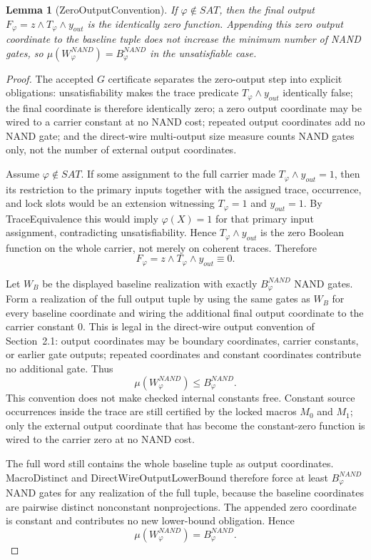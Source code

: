 \documentclass[10.5pt,a4paper]{article}
\newtheorem{lemma}[theorem]{Lemma}
\begin{document}
\begin{lemma}[ZeroOutputConvention]
If \(\varphi\notin SAT\), then the final output \(F_\varphi=z\wedge T_\varphi\wedge y_{out}\) is the identically
zero function.  Appending this zero output coordinate to the baseline tuple does not increase the minimum
number of NAND gates, so \(\mu(W^{NAND}_\varphi)=B^{NAND}_\varphi\) in the unsatisfiable case.
\end{lemma}
\begin{proof}
The accepted \(G\) certificate separates the zero-output step into explicit obligations: unsatisfiability makes the
trace predicate \(T_\varphi\wedge y_{out}\) identically false; the final coordinate is therefore identically zero;
a zero output coordinate may be wired to a carrier constant at no NAND cost; repeated output coordinates add
no NAND gate; and the direct-wire multi-output size measure counts NAND gates only, not the number of
external output coordinates.

Assume \(\varphi\notin SAT\).  If some assignment to the full carrier made
\(T_\varphi\wedge y_{out}=1\), then its restriction to the primary inputs together with the assigned trace,
occurrence, and lock slots would be an extension witnessing \(T_\varphi=1\) and \(y_{out}=1\).  By
TraceEquivalence this would imply \(\varphi(X)=1\) for that primary input assignment, contradicting
unsatisfiability.  Hence \(T_\varphi\wedge y_{out}\) is the zero Boolean function on the whole carrier, not merely
on coherent traces.  Therefore
\[
 F_\varphi=z\wedge T_\varphi\wedge y_{out}\equiv 0 .
\]

Let \(W_B\) be the displayed baseline realization with exactly \(B^{NAND}_\varphi\) NAND gates.  Form a
realization of the full output tuple by using the same gates as \(W_B\) for every baseline coordinate and wiring
the additional final output coordinate to the carrier constant \(0\).  This is legal in the direct-wire output
convention of Section~2.1: output coordinates may be boundary coordinates, carrier constants, or earlier gate
outputs; repeated coordinates and constant coordinates contribute no additional gate.  Thus
\[
 \mu(W^{NAND}_\varphi)\le B^{NAND}_\varphi .
\]
This convention does not make checked internal constants free.  Constant source occurrences inside the trace
are still certified by the locked macros \(M_0\) and \(M_1\); only the external output coordinate that has become
the constant-zero function is wired to the carrier zero at no NAND cost.

The full word still contains the whole baseline tuple as output coordinates.  MacroDistinct and
DirectWireOutputLowerBound therefore force at least \(B^{NAND}_\varphi\) NAND gates for any realization of the
full tuple, because the baseline coordinates are pairwise distinct nonconstant nonprojections.  The appended
zero coordinate is constant and contributes no new lower-bound obligation.  Hence
\[
 \mu(W^{NAND}_\varphi)=B^{NAND}_\varphi .
\]
\end{proof}
\end{document}
